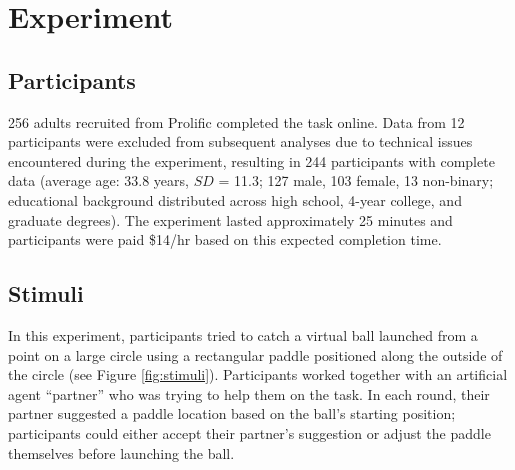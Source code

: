 \documentclass[10pt,letterpaper]{article}
\begin{document}
\section{Experiment}

\subsection{Participants}

256 adults recruited from Prolific completed the task online. Data from 12 participants were excluded from subsequent analyses due to technical issues encountered during the experiment, resulting in 244 participants with complete data (average age: 33.8 years, $SD$ = 11.3; 127 male, 103 female, 13 non-binary; educational background distributed across high school, 4-year college, and graduate degrees). The experiment lasted approximately 25 minutes and participants were paid \$14/hr based on this expected completion time. 


\subsection{Stimuli}

In this experiment, participants tried to catch a virtual ball launched from a point on a large circle using a rectangular paddle positioned along the outside of the circle (see Figure \ref{fig:stimuli}).\footnotemark{} 
Participants worked together with an artificial agent ``partner'' who was trying to help them on the task. In each round, their partner suggested a paddle location based on the ball's starting position; participants could either accept their partner's suggestion or adjust the paddle themselves before launching the ball.

\end{document}
